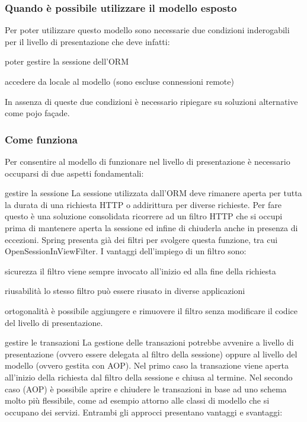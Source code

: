 \subsubsection{Quando è possibile utilizzare il modello esposto}
Per poter utilizzare questo modello sono necessarie due condizioni inderogabili per il livello di presentazione che deve infatti:
\begin{itemize*}
  \item poter gestire la sessione dell'ORM
  \item accedere da locale al modello (sono escluse connessioni remote)
\end{itemize*}
 
In assenza di queste due condizioni è necessario ripiegare su soluzioni alternative come pojo façade.

\subsubsection{Come funziona}
Per consentire al modello di funzionare nel livello di presentazione è necessario occuparsi di due aspetti fondamentali:
\begin{description*}
  \item[gestire la sessione] La sessione utilizzata dall'ORM deve rimanere aperta per tutta la durata di una richiesta HTTP o addirittura per diverse richieste. Per fare questo è una soluzione consolidata ricorrere ad un filtro HTTP che si occupi prima di mantenere aperta la sessione ed infine di chiuderla anche in presenza di eccezioni. Spring presenta già dei filtri per svolgere questa funzione, tra cui OpenSessionInViewFilter. I vantaggi dell'impiego di un filtro sono:
    \begin{description*}
      \item[sicurezza] il filtro viene sempre invocato all'inizio ed alla fine della richiesta
      \item[riusabilità] lo stesso filtro può essere riusato in diverse applicazioni
      \item[ortogonalità] è possibile aggiungere e rimuovere il filtro senza modificare il codice del livello di presentazione. 
    \end{description*}      

  \item[gestire le transazioni] La gestione delle transazioni potrebbe avvenire a livello di presentazione (ovvero essere delegata al filtro della sessione) oppure al livello del modello (ovvero gestita con AOP). Nel primo caso la transazione viene aperta all'inizio della richiesta dal filtro della sessione e chiusa al termine. Nel secondo caso (AOP) è possibile aprire e chiudere le transazioni in base ad uno schema molto più flessibile, come ad esempio attorno alle classi di modello che si occupano dei servizi.
Entrambi gli approcci presentano vantaggi e svantaggi:
\end{description*}

